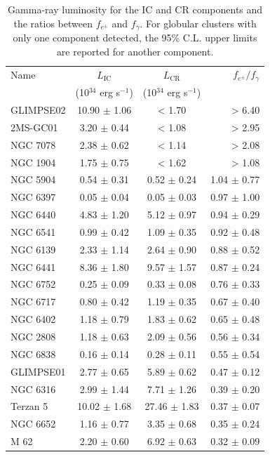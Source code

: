 \documentclass[doublespace,nopageskip]{VTthesis}
\begin{document}
\begin{table}
    \centering
    \caption{Gamma-ray luminosity for the IC and CR  components and the ratios between $f_{e^\pm}$ and $f_\gamma$. For globular clusters with only one component detected, the 95\% C.L. upper limits are reported for another component.}
    \begin{tabular}{lccr}
\toprule
Name & $L_\mathrm{{IC}}$ & $L_\mathrm{CR}$ & $f_{e^\pm}/f_\gamma$ \\
 & (10$^{34}$ erg s$^{-1}$) & (10$^{34}$ erg s$^{-1}$) &  \\
\midrule
GLIMPSE02 & 10.90 $\pm$ 1.06 & < 1.70 & > 6.40 \\
2MS-GC01 & 3.20 $\pm$ 0.44 & < 1.08 & > 2.95 \\
NGC 7078 & 2.38 $\pm$ 0.62 & < 1.14 & > 2.08 \\
NGC 1904 & 1.75 $\pm$ 0.75 & < 1.62 & > 1.08 \\
NGC 5904 & 0.54 $\pm$ 0.31 & 0.52 $\pm$ 0.24 & 1.04 $\pm$ 0.77 \\
NGC 6397 & 0.05 $\pm$ 0.04 & 0.05 $\pm$ 0.03 & 0.97 $\pm$ 1.00 \\
NGC 6440 & 4.83 $\pm$ 1.20 & 5.12 $\pm$ 0.97 & 0.94 $\pm$ 0.29 \\
NGC 6541 & 0.99 $\pm$ 0.42 & 1.09 $\pm$ 0.35 & 0.92 $\pm$ 0.48 \\
NGC 6139 & 2.33 $\pm$ 1.14 & 2.64 $\pm$ 0.90 & 0.88 $\pm$ 0.52 \\
NGC 6441 & 8.36 $\pm$ 1.80 & 9.57 $\pm$ 1.57 & 0.87 $\pm$ 0.24 \\
NGC 6752 & 0.25 $\pm$ 0.09 & 0.33 $\pm$ 0.08 & 0.76 $\pm$ 0.33 \\
NGC 6717 & 0.80 $\pm$ 0.42 & 1.19 $\pm$ 0.35 & 0.67 $\pm$ 0.40 \\
NGC 6402 & 1.18 $\pm$ 0.79 & 1.83 $\pm$ 0.62 & 0.65 $\pm$ 0.48 \\
NGC 2808 & 1.18 $\pm$ 0.63 & 2.09 $\pm$ 0.56 & 0.56 $\pm$ 0.34 \\
NGC 6838 & 0.16 $\pm$ 0.14 & 0.28 $\pm$ 0.11 & 0.55 $\pm$ 0.54 \\
GLIMPSE01 & 2.77 $\pm$ 0.65 & 5.89 $\pm$ 0.62 & 0.47 $\pm$ 0.12 \\
NGC 6316 & 2.99 $\pm$ 1.44 & 7.71 $\pm$ 1.26 & 0.39 $\pm$ 0.20 \\
Terzan 5 & 10.02 $\pm$ 1.68 & 27.46 $\pm$ 1.83 & 0.37 $\pm$ 0.07 \\
NGC 6652 & 1.16 $\pm$ 0.77 & 3.35 $\pm$ 0.68 & 0.35 $\pm$ 0.24 \\
M 62 & 2.20 $\pm$ 0.60 & 6.92 $\pm$ 0.63 & 0.32 $\pm$ 0.09 \\

\end{tabular}
\end{table}
\end{document}
